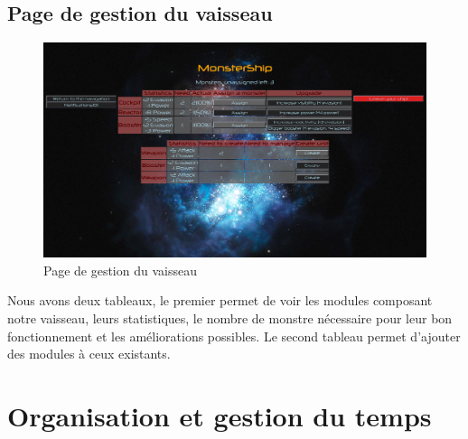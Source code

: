 \documentclass[a4paper,11pt]{report}
\begin{document}
    \section{Page de gestion du vaisseau}
        \begin{figure}[H]
            \begin{center}
                \includegraphics[width=\textwidth]{maquette/screens/manage.png}
                \caption{Page de gestion du vaisseau}
                \label{fig:gestion}
            \end{center}
        \end{figure}
        Nous avons deux tableaux, le premier permet de voir les modules composant notre vaisseau, leurs statistiques, le nombre de monstre nécessaire pour leur bon fonctionnement et les améliorations possibles. Le second tableau permet d'ajouter des modules à ceux existants.

\chapter{Organisation et gestion du temps}
\end{document}

